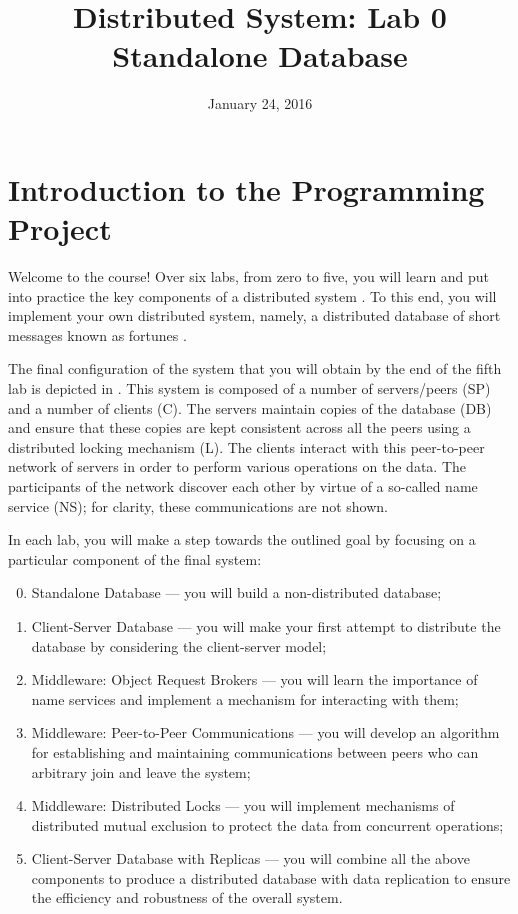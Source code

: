 \documentclass[a4paper,10pt]{article}
\title{Distributed System: Lab 0\\Standalone Database}
\author{}
\date{January 24, 2016}
\begin{document}
\maketitle

\section{Introduction to the Programming Project} 

Welcome to the course! Over six labs, from zero to five, you will learn and put
into practice the key components of a distributed system \cite{lecture1}. To
this end, you will implement your own distributed system, namely, a distributed
database of short messages known as fortunes \cite{fortune}.

The final configuration of the system that you will obtain by the end of the
fifth lab is depicted in . This system is composed of
a number of servers/peers (SP) and a number of clients (C). The servers maintain
copies of the database (DB) and ensure that these copies are kept consistent
across all the peers using a distributed locking mechanism (L). The clients
interact with this peer-to-peer network of servers in order to perform various
operations on the data. The participants of the network discover each other by
virtue of a so-called name service (NS); for clarity, these communications are
not shown.

In each lab, you will make a step towards the outlined goal by focusing on a
particular component of the final system:
\begin{enumerate}

  \setcounter{enumi}{-1}

  \item Standalone Database --- you will build a non-distributed database;

  \item Client-Server Database --- you will make your first attempt to
  distribute the database by considering the client-server model;

  \item Middleware: Object Request Brokers --- you will learn the importance of
  name services and implement a mechanism for interacting with them;

  \item Middleware: Peer-to-Peer Communications --- you will develop an
  algorithm for establishing and maintaining communications between peers who
  can arbitrary join and leave the system;

  \item Middleware: Distributed Locks --- you will implement mechanisms of
  distributed mutual exclusion to protect the data from concurrent operations;

  \item Client-Server Database with Replicas --- you will combine all the above
  components to produce a distributed database with data replication to ensure
  the efficiency and robustness of the overall system.

\end{enumerate}
\end{document}
